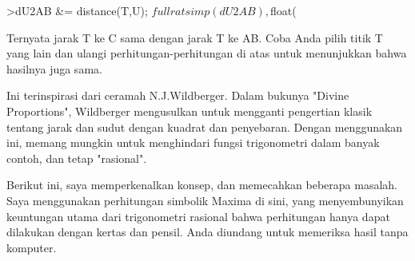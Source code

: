 \documentclass[a4paper,10pt]{article}
\begin{document}
\begin{eulernotebook}
\begin{eulercomment}
\begin{eulercomment}
\begin{eulercomment}
\begin{eulercomment}
\begin{eulercomment}
\begin{eulercomment}
\begin{eulercomment}
\begin{eulercomment}
\begin{eulercomment}
\begin{eulercomment}
\begin{eulercomment}
\begin{eulercomment}
\begin{eulercomment}
\begin{eulercomment}
\begin{eulercomment}
\begin{eulercomment}
\begin{eulerprompt}
>dU2AB &= distance(T,U); $fullratsimp(dU2AB), $float(%
\end{eulerprompt}
\begin{eulercomment}
Ternyata jarak T ke C sama dengan jarak T ke AB. Coba Anda pilih titik T yang lain dan
ulangi perhitungan-perhitungan di atas untuk menunjukkan bahwa hasilnya juga sama.
\end{eulercomment}
\begin{eulercomment}
Ini terinspirasi dari ceramah N.J.Wildberger. Dalam bukunya "Divine
Proportions", Wildberger mengusulkan untuk mengganti pengertian klasik
tentang jarak dan sudut dengan kuadrat dan penyebaran. Dengan
menggunakan ini, memang mungkin untuk menghindari fungsi trigonometri
dalam banyak contoh, dan tetap "rasional".

Berikut ini, saya memperkenalkan konsep, dan memecahkan beberapa
masalah. Saya menggunakan perhitungan simbolik Maxima di sini, yang
menyembunyikan keuntungan utama dari trigonometri rasional bahwa
perhitungan hanya dapat dilakukan dengan kertas dan pensil. Anda
diundang untuk memeriksa hasil tanpa komputer.


\end{eulercomment}
\end{eulercomment}
\end{eulercomment}
\end{eulercomment}
\end{eulercomment}
\end{eulercomment}
\end{eulercomment}
\end{eulercomment}
\end{eulercomment}
\end{eulercomment}
\end{eulercomment}
\end{eulercomment}
\end{eulercomment}
\end{eulercomment}
\end{eulercomment}
\end{eulercomment}
\end{eulercomment}
\end{eulernotebook}
\end{document}

